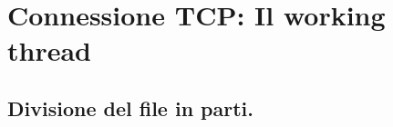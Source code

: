 \chapter{Connessione TCP: Il working thread}
\section{Divisione del file in parti.}\label{sec:download_tcp}
